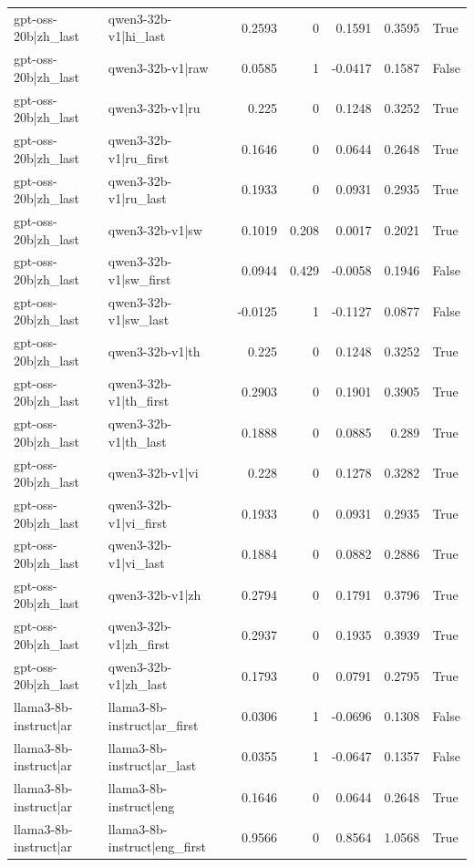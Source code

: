 \begin{table}
\begin{tabular}{l l r r r r l}
gpt-oss-20b|zh_last & qwen3-32b-v1|hi_last & 0.2593 & 0 & 0.1591 & 0.3595 & True \\
gpt-oss-20b|zh_last & qwen3-32b-v1|raw & 0.0585 & 1 & -0.0417 & 0.1587 & False \\
gpt-oss-20b|zh_last & qwen3-32b-v1|ru & 0.225 & 0 & 0.1248 & 0.3252 & True \\
gpt-oss-20b|zh_last & qwen3-32b-v1|ru_first & 0.1646 & 0 & 0.0644 & 0.2648 & True \\
gpt-oss-20b|zh_last & qwen3-32b-v1|ru_last & 0.1933 & 0 & 0.0931 & 0.2935 & True \\
gpt-oss-20b|zh_last & qwen3-32b-v1|sw & 0.1019 & 0.208 & 0.0017 & 0.2021 & True \\
gpt-oss-20b|zh_last & qwen3-32b-v1|sw_first & 0.0944 & 0.429 & -0.0058 & 0.1946 & False \\
gpt-oss-20b|zh_last & qwen3-32b-v1|sw_last & -0.0125 & 1 & -0.1127 & 0.0877 & False \\
gpt-oss-20b|zh_last & qwen3-32b-v1|th & 0.225 & 0 & 0.1248 & 0.3252 & True \\
gpt-oss-20b|zh_last & qwen3-32b-v1|th_first & 0.2903 & 0 & 0.1901 & 0.3905 & True \\
gpt-oss-20b|zh_last & qwen3-32b-v1|th_last & 0.1888 & 0 & 0.0885 & 0.289 & True \\
gpt-oss-20b|zh_last & qwen3-32b-v1|vi & 0.228 & 0 & 0.1278 & 0.3282 & True \\
gpt-oss-20b|zh_last & qwen3-32b-v1|vi_first & 0.1933 & 0 & 0.0931 & 0.2935 & True \\
gpt-oss-20b|zh_last & qwen3-32b-v1|vi_last & 0.1884 & 0 & 0.0882 & 0.2886 & True \\
gpt-oss-20b|zh_last & qwen3-32b-v1|zh & 0.2794 & 0 & 0.1791 & 0.3796 & True \\
gpt-oss-20b|zh_last & qwen3-32b-v1|zh_first & 0.2937 & 0 & 0.1935 & 0.3939 & True \\
gpt-oss-20b|zh_last & qwen3-32b-v1|zh_last & 0.1793 & 0 & 0.0791 & 0.2795 & True \\
llama3-8b-instruct|ar & llama3-8b-instruct|ar_first & 0.0306 & 1 & -0.0696 & 0.1308 & False \\
llama3-8b-instruct|ar & llama3-8b-instruct|ar_last & 0.0355 & 1 & -0.0647 & 0.1357 & False \\
llama3-8b-instruct|ar & llama3-8b-instruct|eng & 0.1646 & 0 & 0.0644 & 0.2648 & True \\
llama3-8b-instruct|ar & llama3-8b-instruct|eng_first & 0.9566 & 0 & 0.8564 & 1.0568 & True \\

\end{tabular}
\end{table}
